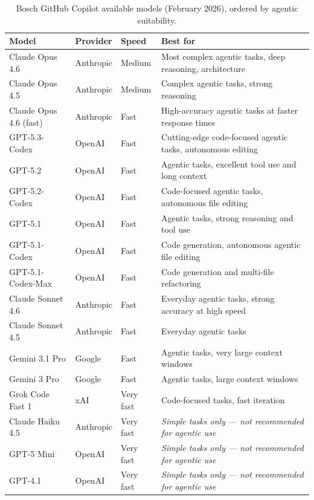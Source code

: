 \begin{table}[h!]
\centering
\begin{tabular}{lllp{5.5cm}}
   \toprule
   \textbf{Model} & \textbf{Provider} & \textbf{Speed} & \textbf{Best for} \\
   \midrule
   Claude Opus 4.6           & Anthropic & Medium    & Most complex agentic tasks, deep reasoning, architecture \\
   Claude Opus 4.5           & Anthropic & Medium    & Complex agentic tasks, strong reasoning \\
   Claude Opus 4.6 (fast)    & Anthropic & Fast      & High-accuracy agentic tasks at faster response times \\
   GPT-5.3-Codex             & OpenAI    & Fast      & Cutting-edge code-focused agentic tasks, autonomous editing \\
   GPT-5.2                   & OpenAI    & Fast      & Agentic tasks, excellent tool use and long context \\
   GPT-5.2-Codex             & OpenAI    & Fast      & Code-focused agentic tasks, autonomous file editing \\
   GPT-5.1                   & OpenAI    & Fast      & Agentic tasks, strong reasoning and tool use \\
   GPT-5.1-Codex             & OpenAI    & Fast      & Code generation, autonomous agentic file editing \\
   GPT-5.1-Codex-Max         & OpenAI    & Fast      & Code generation and multi-file refactoring \\
   Claude Sonnet 4.6         & Anthropic & Fast      & Everyday agentic tasks, strong accuracy at high speed \\
   Claude Sonnet 4.5         & Anthropic & Fast      & Everyday agentic tasks \\
   Gemini 3.1 Pro            & Google    & Fast      & Agentic tasks, very large context windows \\
   Gemini 3 Pro              & Google    & Fast      & Agentic tasks, large context windows \\
   Grok Code Fast 1          & xAI       & Very fast & Code-focused tasks, fast iteration \\
   \midrule
   Claude Haiku 4.5          & Anthropic & Very fast & \textit{Simple tasks only — not recommended for agentic use} \\
   GPT-5 Mini                & OpenAI    & Very fast & \textit{Simple tasks only — not recommended for agentic use} \\
   GPT-4.1                   & OpenAI    & Very fast & \textit{Simple tasks only — not recommended for agentic use} \\
   \bottomrule
\end{tabular}
\caption{Bosch GitHub Copilot available models (February 2026), ordered by agentic suitability.}
\label{tab:copilot-models}
\end{table}

